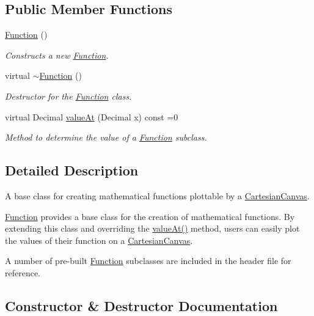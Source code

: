 \subsection*{Public Member Functions}
\begin{DoxyCompactItemize}
\item 
\hyperlink{classtsgl_1_1_function_aaf959c9d39bb45c2aded83fd754c288d}{Function} ()
\begin{DoxyCompactList}\small\item\em Constructs a new \hyperlink{classtsgl_1_1_function}{Function}. \end{DoxyCompactList}\item 
virtual \hyperlink{classtsgl_1_1_function_a3b8cbd26a32c6ae75b12e7397bb42c41}{$\sim$\+Function} ()
\begin{DoxyCompactList}\small\item\em Destructor for the \hyperlink{classtsgl_1_1_function}{Function} class. \end{DoxyCompactList}\item 
virtual Decimal \hyperlink{classtsgl_1_1_function_affb7b3b19a04efefa29a9870d666e912}{value\+At} (Decimal x) const =0
\begin{DoxyCompactList}\small\item\em Method to determine the value of a \hyperlink{classtsgl_1_1_function}{Function} subclass. \end{DoxyCompactList}\end{DoxyCompactItemize}


\subsection{Detailed Description}
A base class for creating mathematical functions plottable by a \hyperlink{classtsgl_1_1_cartesian_canvas}{Cartesian\+Canvas}. 

\hyperlink{classtsgl_1_1_function}{Function} provides a base class for the creation of mathematical functions. By extending this class and overriding the \hyperlink{classtsgl_1_1_function_affb7b3b19a04efefa29a9870d666e912}{value\+At()} method, users can easily plot the values of their function on a \hyperlink{classtsgl_1_1_cartesian_canvas}{Cartesian\+Canvas}.

A number of pre-\/built \hyperlink{classtsgl_1_1_function}{Function} subclasses are included in the header file for reference. 

\subsection{Constructor \& Destructor Documentation}
\mbox{\label{classtsgl_1_1_function_aaf959c9d39bb45c2aded83fd754c288d}} 
